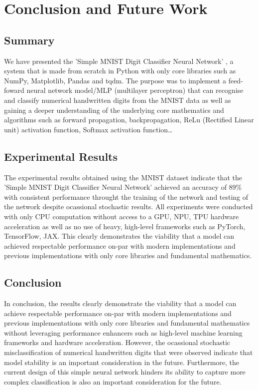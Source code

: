 \documentclass[11pt]{article}
\begin{document}
\section{Conclusion and Future Work}
\subsection{Summary}
We have presented the 'Simple MNIST Digit Classifier Neural Network' \cite{simplemnsit}, a system that is made from scratch in Python with only core libraries such as NumPy, Matplotlib, Pandas and tqdm. The purpose was to implement a feed-foward neural network model/MLP (multilayer perceptron) that can recognise and classify numerical handwritten digits from the MNIST data as well as gaining a deeper understanding of the underlying core mathematics and algorithms such as forward propagation, backpropagation, ReLu (Rectified Linear unit) activation function, Softmax activation function\dots

\subsection{Experimental Results}
The experimental results obtained using the MNIST dataset indicate that the 'Simple MNIST Digit Classifier Neural Network' achieved an accuracy of 89\% with consistent performance throught the training of the network and testing of the network despite ocassional stochastic results. All experiments were conducted with only CPU computation without access to a GPU, NPU, TPU hardware acceleration as well as no use of heavy, high-level frameworks such as PyTorch, TensorFlow, JAX. This clearly demonstrates the viability that a model can achieved respectable performance on-par with modern implementations and previous implementations with only core libraries and fundamental mathematics.

\subsection{Conclusion}
In conclusion, the results clearly demonstrate the viability that a model can achieve respectable performance on-par with modern implementations and previous implementations with only core libraries and fundamental mathematics without leveraging performance enhancers such as high-level machine learning frameworks and hardware acceleration. However, the ocassional stochastic misclassification of numerical handwritten digits that were observed indicate that model stability is an important consideration in the future. Furthermore, the current design of this simple neural network hinders its ability to capture more complex classification is also an important consideration for the future.
\end{document}
